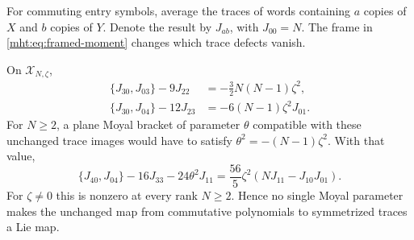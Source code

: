 For commuting entry symbols, average the traces of words
containing $a$ copies of $X$ and $b$ copies of $Y$.
Denote the result by $J_{ab}$, with $J_{00}=N$. The frame in
\eqref{mht:eq:framed-moment} changes which trace defects vanish.

\begin{proposition}\label{mht:prop:framed-residual}
On $\mathcal X_{N,\zeta}$,
\begin{align}
 \{J_{30},J_{03}\}-9J_{22}
       &=-\tfrac32N(N-1)\zeta^2,\label{mht:eq:framed-cubic}\\
 \{J_{30},J_{04}\}-12J_{23}
       &=-6(N-1)\zeta^2J_{01}.\label{mht:eq:framed-cubic-quartic}
\end{align}
For $N\geq2$, a plane Moyal bracket of parameter $\theta$
compatible with these unchanged trace images would have to
satisfy $\theta^2=-(N-1)\zeta^2$. With that value,
\begin{equation}\label{mht:eq:framed-quartic-residual}
 \{J_{40},J_{04}\}-16J_{33}-24\theta^2J_{11}
       =\frac{56}{5}\zeta^2(NJ_{11}-J_{10}J_{01}).
\end{equation}
For $\zeta\ne0$ this is nonzero at every rank $N\geq2$.
Hence no single Moyal parameter makes the unchanged map from
commutative polynomials to symmetrized traces a Lie map.
\end{proposition}
